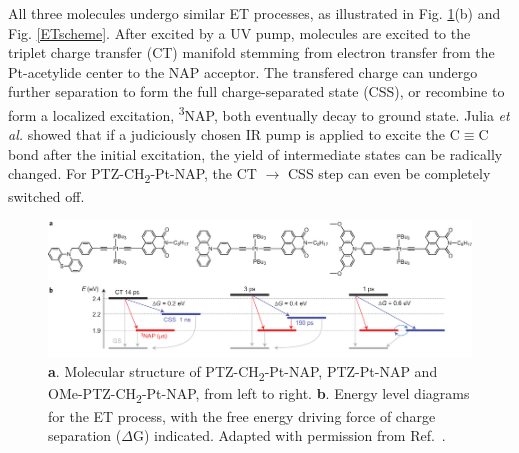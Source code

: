 All three molecules undergo similar ET processes, as illustrated in Fig. \ref{JuliaStruct}(b) and Fig. \ref{ETscheme}. After excited by a UV pump, molecules are excited to the triplet charge transfer (CT) manifold stemming from electron transfer from the Pt-acetylide center to the NAP acceptor. The transfered charge can undergo further separation to form the full charge-separated state (CSS), or recombine to form a localized excitation, \textsuperscript{3}NAP, both eventually decay to ground state. Julia {\em et al.} showed that if a judiciously chosen IR pump is applied to excite the C$\equiv$C bond after the initial excitation, the yield of intermediate states can be radically changed. For PTZ-CH\textsubscript{2}-Pt-NAP, the CT $\rightarrow$ CSS step can even be completely switched off.


\begin{figure}[!t]
\includegraphics[width=\columnwidth]{Chapters/chap4/Images/molecules.jpg}
\caption{\textbf{a}. Molecular structure of PTZ-CH\textsubscript{2}-Pt-NAP, PTZ-Pt-NAP and OMe-PTZ-CH\textsubscript{2}-Pt-NAP, from left to right. \textbf{b}. Energy level diagrams for the ET process, with the free energy driving force of charge separation ($\Delta$G) indicated. Adapted with permission from Ref.~\cite{delor2015mechanism}.\label{JuliaStruct}}
\end{figure}


